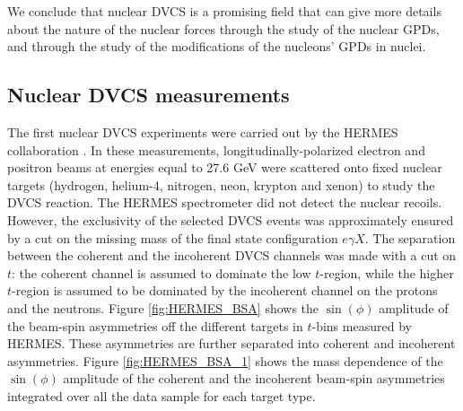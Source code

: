 We conclude that nuclear DVCS is a promising field that can give more details about the nature of the nuclear forces through the study of the nuclear GPDs, and through the study of the modifications of the nucleons' GPDs in nuclei.

\subsection{Nuclear DVCS measurements}
The first nuclear DVCS experiments were carried out by the HERMES 
collaboration \cite{HERMES_BSA}. In these measurements, 
longitudinally-polarized electron and positron beams at energies equal to 27.6 
GeV were scattered onto fixed nuclear targets (hydrogen, helium-4, nitrogen, 
neon, krypton and xenon) to study the DVCS reaction. The HERMES spectrometer 
did not detect the nuclear recoils. However, the exclusivity of the selected 
DVCS events was approximately ensured by a cut on the missing mass of the final 
state configuration $e\gamma X$. The separation between the coherent and the 
incoherent DVCS channels was made with a cut on $t$: the coherent channel is 
assumed to dominate the low $t$-region, while the higher $t$-region is assumed 
to be dominated by the incoherent channel on the protons and the neutrons.  
Figure \ref{fig:HERMES_BSA} shows the $\sin(\phi)$ amplitude of the beam-spin 
asymmetries off the different targets in $t$-bins measured by HERMES.  These 
asymmetries are further separated into coherent and incoherent asymmetries.  
Figure \ref{fig:HERMES_BSA_1} shows the mass dependence of the $\sin(\phi)$ 
amplitude of the coherent and the incoherent beam-spin asymmetries integrated 
over all the data sample for each target type.


